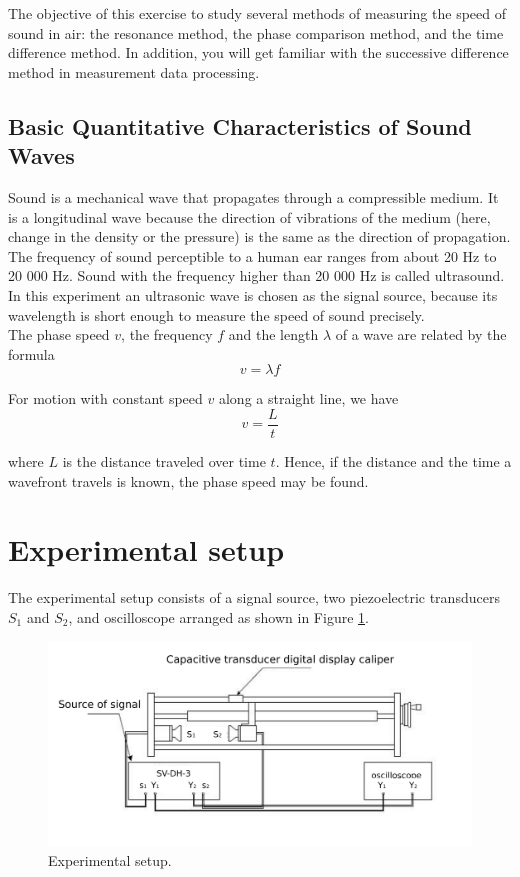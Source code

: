 \documentclass{article}
\begin{document}
The objective of this exercise to study several methods of measuring the speed of
sound in air: the resonance method, the phase comparison method, and the time difference
method. In addition, you will get familiar with the successive difference method in
measurement data processing.
\\

\subsection{Basic Quantitative Characteristics of Sound Waves}

Sound is a mechanical wave that propagates through a compressible medium. It is a
longitudinal wave because the direction of vibrations of the medium (here, change in the
density or the pressure) is the same as the direction of propagation. The frequency of
sound perceptible to a human ear ranges from about 20 Hz to 20 000 Hz. Sound with the
frequency higher than 20 000 Hz is called ultrasound. In this experiment an ultrasonic
wave is chosen as the signal source, because its wavelength is short enough to measure
the speed of sound precisely.
\\

The phase speed $v$, the frequency $f$ and the length $\lambda$ of a wave are related by the
formula
\begin{equation}\label{eq-1}
v=\lambda f
\end{equation}

For motion with constant speed $v$ along a straight line, we have
\begin{equation}\label{eq-2}
v=\frac{L}{t}
\end{equation}

where $L$ is the distance traveled over time $t$. Hence, if the distance and the time a
wavefront travels is known, the phase speed may be found.

\section{Experimental setup}

The experimental setup consists of a signal source, two piezoelectric transducers $S_1$
and $S_2$, and oscilloscope arranged as shown in Figure \ref{fig-1}.

\begin{figure}[!h]
	\centering
	\includegraphics[width=13cm]{fig-1.png}
	\caption{Experimental setup.
	\label{fig-1}}
\end{figure}
\end{document}
